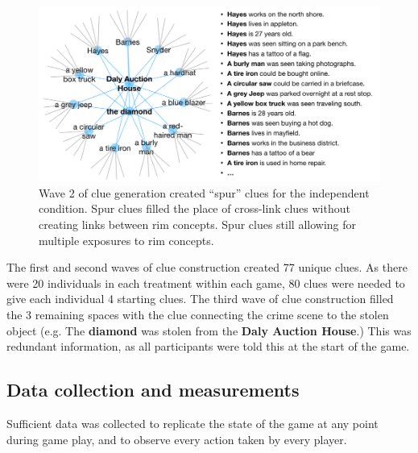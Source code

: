 \documentclass{article}
\begin{document}
\begin{figure}[h!]
\centering
\includegraphics[width=0.7\columnwidth]{Spur Clues.png}
\caption{Wave 2 of clue generation created ``spur'' clues for the independent condition. Spur clues filled the place of cross-link clues without creating links between rim concepts. Spur clues still allowing for multiple exposures to rim concepts.}
\label{fig:spurs}
\end{figure}

The first and second waves of clue construction created 77 unique clues. As there were 20 individuals in each treatment within each game, 80 clues were needed to give each individual 4 starting clues. The third wave of clue construction filled the 3 remaining spaces with the clue connecting the crime scene to the stolen object (e.g. The \textbf{diamond} was stolen from the \textbf{Daly Auction House}.) This was redundant information, as all participants were told this at the start of the game. 


\subsection{Data collection and measurements}
\label{data_collection}
Sufficient data was collected to replicate the state of the game at any point during game play, and to observe every action taken by every player.
\end{document}
